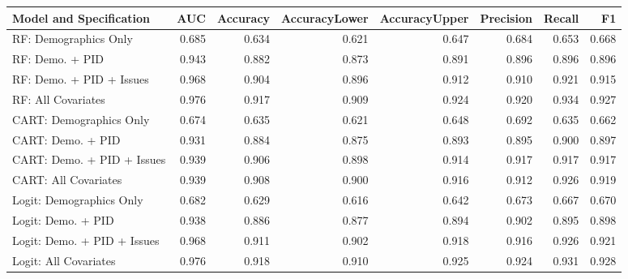 \begin{table}[H]
\centering
\begin{tabular}{lrrrrrrr}
  \toprule
Model and Specification & AUC & Accuracy & AccuracyLower & AccuracyUpper & Precision & Recall & F1 \\ 
  \midrule
RF: Demographics Only & 0.685 & 0.634 & 0.621 & 0.647 & 0.684 & 0.653 & 0.668 \\ 
  RF: Demo. + PID & 0.943 & 0.882 & 0.873 & 0.891 & 0.896 & 0.896 & 0.896 \\ 
  RF: Demo. + PID + Issues & 0.968 & 0.904 & 0.896 & 0.912 & 0.910 & 0.921 & 0.915 \\ 
  RF: All Covariates & 0.976 & 0.917 & 0.909 & 0.924 & 0.920 & 0.934 & 0.927 \\ 
  CART: Demographics Only & 0.674 & 0.635 & 0.621 & 0.648 & 0.692 & 0.635 & 0.662 \\ 
  CART: Demo. + PID & 0.931 & 0.884 & 0.875 & 0.893 & 0.895 & 0.900 & 0.897 \\ 
  CART: Demo. + PID + Issues & 0.939 & 0.906 & 0.898 & 0.914 & 0.917 & 0.917 & 0.917 \\ 
  CART: All Covariates & 0.939 & 0.908 & 0.900 & 0.916 & 0.912 & 0.926 & 0.919 \\ 
  Logit: Demographics Only & 0.682 & 0.629 & 0.616 & 0.642 & 0.673 & 0.667 & 0.670 \\ 
  Logit: Demo. + PID & 0.938 & 0.886 & 0.877 & 0.894 & 0.902 & 0.895 & 0.898 \\ 
  Logit: Demo. + PID + Issues & 0.968 & 0.911 & 0.902 & 0.918 & 0.916 & 0.926 & 0.921 \\ 
  Logit: All Covariates & 0.976 & 0.918 & 0.910 & 0.925 & 0.924 & 0.931 & 0.928 \\ 
   \bottomrule
\end{tabular}
\end{table}
